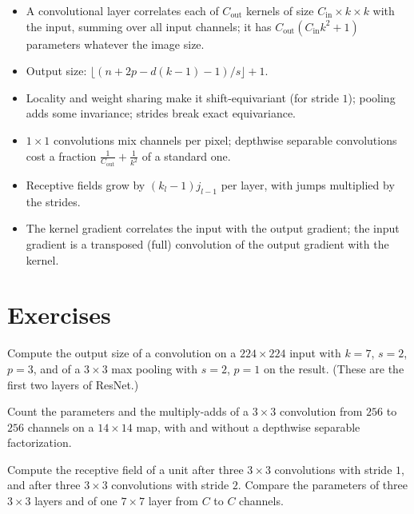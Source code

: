 \begin{notechapter}
\begin{chaptersummary}
\begin{itemize}[nosep]
  \item A convolutional layer correlates each of $C_{\mathrm{out}}$ kernels of size $C_{\mathrm{in}}\times k\times k$ with the input, summing over all
        input channels; it has $C_{\mathrm{out}}(C_{\mathrm{in}}k^2 + 1)$ parameters whatever the image size.
  \item Output size: $\lfloor(n + 2p - d(k - 1) - 1)/s\rfloor + 1$.
  \item Locality and weight sharing make it shift-equivariant (for stride $1$); pooling adds some
        invariance; strides break exact equivariance.
  \item $1\times1$ convolutions mix channels per pixel; depthwise separable convolutions cost a fraction
        $\frac1{C_{\mathrm{out}}} + \frac1{k^2}$ of a standard one.
  \item Receptive fields grow by $(k_l - 1)j_{l-1}$ per layer, with jumps multiplied by the strides.
  \item The kernel gradient correlates the input with the output gradient; the input gradient
        is a transposed (full) convolution of the output gradient with the kernel.
\end{itemize}
\end{chaptersummary}

\section*{Exercises}

\begin{exercise}\label{convolutional-layers:exr:1}
Compute the output size of a convolution on a $224\times224$ input with $k = 7$, $s = 2$, $p = 3$, and of a $3\times3$
max pooling with $s = 2$, $p = 1$ on the result. (These are the first two layers of ResNet.)
\end{exercise}

\begin{exercise}\label{convolutional-layers:exr:2}
Count the parameters and the multiply-adds of a $3\times3$ convolution from $256$ to $256$ channels on a $14\times14$
map, with and without a depthwise separable factorization.
\end{exercise}

\begin{exercise}\label{convolutional-layers:exr:3}
Compute the receptive field of a unit after three $3\times3$ convolutions with stride $1$, and after three
$3\times3$ convolutions with stride $2$. Compare the parameters of three $3\times3$ layers and of one $7\times7$ layer
from $C$ to $C$ channels.
\end{exercise}


\end{notechapter}
